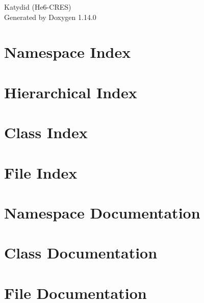 \documentclass[twoside]{book}
\newcommand{\+}{\discretionary{\mbox{\scriptsize$\hookleftarrow$}}{}{}}
\newcommand{\clearemptydoublepage}{%
    \newpage{\pagestyle{empty}\cleardoublepage}%
  }
\begin{document}
  \raggedbottom
    \hypersetup{pageanchor=false,
                bookmarksnumbered=true,
                pdfencoding=unicode
               }
  \begin{titlepage}
  \vspace*{7cm}
  \begin{center}%
  {\Large Katydid (\+He6-\/\+CRES)}\\
  \vspace*{1cm}
  {\large Generated by Doxygen 1.14.0}\\
  \end{center}
  \end{titlepage}
  \clearemptydoublepage
  \tableofcontents
  \clearemptydoublepage
  \hypersetup{pageanchor=true}
\chapter{Namespace Index}

\chapter{Hierarchical Index}

\chapter{Class Index}

\chapter{File Index}

\chapter{Namespace Documentation}

\chapter{Class Documentation}


\chapter{File Documentation}



  \backmatter
  \newpage
  \clearemptydoublepage
  \printindex
\end{document}
